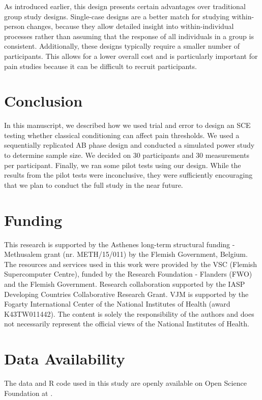 \documentclass{jote-article}
\begin{document}
As introduced earlier, this design presents certain advantages over traditional group study designs. Single-case designs are a better match for studying within-person changes, because they allow detailed insight into within-individual processes rather than assuming that the response of all individuals in a group is consistent. Additionally, these designs typically require a smaller number of participants. This allows for a lower overall cost and is particularly important for pain studies because it can be difficult to recruit participants.

\section{Conclusion}

In this manuscript, we described how we used trial and error to design an SCE testing whether classical conditioning can affect pain thresholds. We used a sequentially replicated AB phase design and conducted a simulated power study to determine sample size. We decided on 30 participants and 30 measurements per participant. Finally, we ran some pilot tests using our design. While the results from the pilot tests were inconclusive, they were sufficiently encouraging that we plan to conduct the full study in the near future.

\section{Funding}

This research is supported by the Asthenes long-term structural funding - Methusalem grant (nr. METH/15/011) by the Flemish Government, Belgium. The resources and services used in this work were provided by the VSC (Flemish Supercomputer Centre), funded by the Research Foundation - Flanders (FWO) and the Flemish Government. Research collaboration supported by the IASP Developing Countries Collaborative Research Grant. VJM is supported by the Fogarty International Center of the National Institutes of Health (award K43TW011442). The content is solely the responsibility of the authors and does not necessarily represent the official views of the National Institutes of Health.

\section{Data Availability}

The data and R code used in this study are openly available on Open Science Foundation at .
\end{document}
